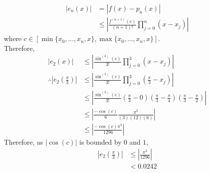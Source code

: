 \documentclass[fleqn, a4paper, 12pt, twoside]{article}
\theoremstyle{definition}
\theoremstyle{theorem}
\begin{document}
\begin{solution}
	\begin{align*}
		|e_n(x)| & = \left| f(x) - p_n(x) \right| \\
                         & \le \left| \frac{f^{(n + 1)}(c)}{(n + 1)!} \prod\limits_{j = 0}^{n} (x - x_j) \right|
	\end{align*}
	where $c \in \left[ \min\{x_0,\dots,x_n,x\} , \max\{x_0,\dots,x_n,x\} \right]$.\\
	Therefore,
	\begin{align*}
		|e_2(x)|                                                  & \le \left| \frac{\sin^{(3)}(c)}{3!} \prod\limits_{j = 0}^{3} (x - x_j) \right|                                                                                         \\
		\therefore \left| e_2\left( \frac{\pi}{3} \right) \right| & \le \left| \frac{\sin^{(3)}(c)}{3!} \prod\limits_{j = 0}^{3} \left( \frac{\pi}{3} - x_j \right) \right|                                                                \\
                                                                          & \le \left| \frac{\sin^{(3)}(c)}{3!} \left( \frac{\pi}{3} - 0 \right) \left( \frac{\pi}{3} - \frac{\pi}{4} \right) \left( \frac{\pi}{3} - \frac{\pi}{2} \right) \right| \\
                                                                          & \le \left| \frac{-\cos(c)}{6} \frac{\pi^3}{(3) (12) (6)} \right|                                                                                                       \\
                                                                          & \le \left| \frac{-\cos(c) \pi^3}{1296} \right|
	\end{align*}
	Therefore, as $\left| \cos(c) \right|$ is bounded by $0$ and $1$,
	\begin{align*}
		\left| e_2\left( \frac{\pi}{3} \right) \right| & \le \left| \frac{\pi^3}{1296} \right| \\
                                                               & < 0.0242
	\end{align*}
\end{solution}
\end{document}
